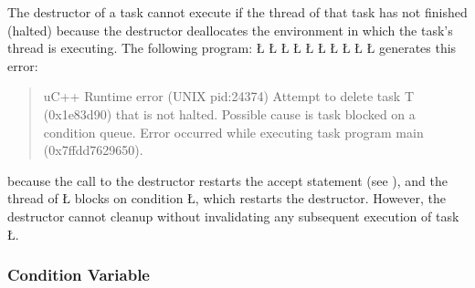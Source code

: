 \documentclass[openright,twoside]{report}
\begin{document}
The destructor of a task cannot execute if the thread of that task has not finished (halted) because the destructor deallocates the environment in which the task's thread is executing.
The following program:
\LGinlinefalse\LGbegin\lgrinde
\L{}
\L{\LB{}}
\L{\LB{}}
\L{\LB{}}
\CE{}\L{\LB{}}
\CE{}\L{\LB{}}
\L{\LB{\};}}
\L{}
\L{\LB{}}
\L{}
\CE{}\endlgrinde\LGend
generates this error:
\begin{quote}
\BGfont
uC++ Runtime error (UNIX pid:24374) Attempt to delete task T (0x1e83d90) that is not halted.
Possible cause is task blocked on a condition queue.
Error occurred while executing task program main (0x7ffdd7629650).
\end{quote}
because the call to the destructor restarts the accept statement (see ), and the thread of \LGinlinetrue\LGbegin\lgrinde\L{}\endlgrinde\LGend{} blocks on condition \LGinlinetrue\LGbegin\lgrinde\L{}\endlgrinde\LGend{}, which restarts the destructor.
However, the destructor cannot cleanup without invalidating any subsequent execution of task \LGinlinetrue\LGbegin\lgrinde\L{}\endlgrinde\LGend{}.


\subsubsection{Condition Variable}
\end{document}
